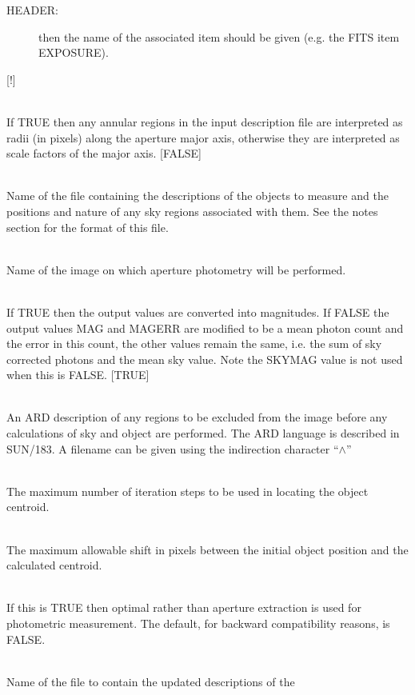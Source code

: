 \documentclass[twoside,11pt]{article}
\newcommand{\xref}[3]{#1}
\renewcommand{\_}{\texttt{\symbol{95}}}
\newcommand{\qt}[1]{``#1''}
\newcommand{\sstsubsection}[1]{ \item[{#1}] \mbox{} \\}
\newcommand{\sstsubsection}[1]{\item[{#1}]}
\begin{document}
{{{\begin{description}
          \item[HEADER:] then the name of the associated item should be given
            (e.g. the FITS item EXPOSURE).

        \end{description}
        [!]
      }
      \sstsubsection{
         FIXANN = \_LOGICAL (Read)
      }{
         If TRUE then any annular regions in the input description file
         are interpreted as radii (in pixels) along the aperture major
         axis, otherwise they are interpreted as scale factors of the
         major axis.
         [FALSE]
      }
      \sstsubsection{
         INFILE = LITERAL (Read)
      }{
         Name of the file containing the descriptions of the objects to
         measure and the positions and nature of any sky regions associated
         with them. See the notes section for the format of this file.
      }
      \sstsubsection{
         IN = IMAGE (Read)
      }{
         Name of the image on which aperture photometry will be
         performed.
      }
      \sstsubsection{
         USEMAGS = \_LOGICAL (Read)
      }{
         If TRUE then the output values are converted into magnitudes.
         If FALSE the output values MAG and MAGERR are modified to be
         a mean photon count and the error in this count, the other
         values remain the same, i.e. the sum of sky corrected photons
         and the mean sky value. Note the SKYMAG value is not used
         when this is FALSE.
         [TRUE]
      }
      \sstsubsection{
         MASK = LITERAL (Read)
      }{
         An ARD description of any regions to be excluded from the image
         before any calculations of sky and object are performed. The
         ARD language is described in \xref{SUN/183}{sun183}{}. A
         filename can be given using the indirection character
         \qt{$\wedge$}
      }
      \sstsubsection{
         MAXITER = \_INTEGER (Read)
      }{
         The maximum number of iteration steps to be used in locating
         the object centroid.
      }
      \sstsubsection{
         MAXSHIFT = \_REAL (Read)
      }{
         The maximum allowable shift in pixels between the initial
         object position and the calculated centroid.
      }
      \sstsubsection{
         OPTIMA = \_LOGICAL (Read)
      }{
         If this is TRUE then optimal rather than aperture extraction
         is used for photometric measurement. The default, for backward
         compatibility reasons, is FALSE.
      }      
      \sstsubsection{
         OUTFILE = FILENAME (Read)
      }{
         Name of the file to contain the updated descriptions of the
}}}
\end{document}
